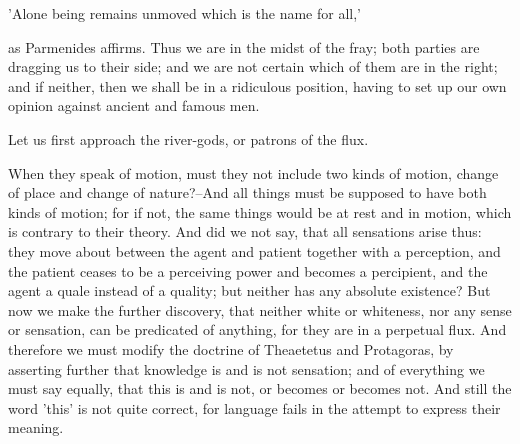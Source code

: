      'Alone being remains unmoved which is the name for all,'

as Parmenides affirms. Thus we are in the midst of the fray; both
parties are dragging us to their side; and we are not certain which of
them are in the right; and if neither, then we shall be in a ridiculous
position, having to set up our own opinion against ancient and famous
men.

Let us first approach the river-gods, or patrons of the flux.

When they speak of motion, must they not include two kinds of motion,
change of place and change of nature?--And all things must be supposed
to have both kinds of motion; for if not, the same things would be at
rest and in motion, which is contrary to their theory. And did we not
say, that all sensations arise thus: they move about between the agent
and patient together with a perception, and the patient ceases to be a
perceiving power and becomes a percipient, and the agent a quale instead
of a quality; but neither has any absolute existence? But now we make
the further discovery, that neither white or whiteness, nor any sense
or sensation, can be predicated of anything, for they are in a perpetual
flux. And therefore we must modify the doctrine of Theaetetus and
Protagoras, by asserting further that knowledge is and is not sensation;
and of everything we must say equally, that this is and is not, or
becomes or becomes not. And still the word 'this' is not quite correct,
for language fails in the attempt to express their meaning.

